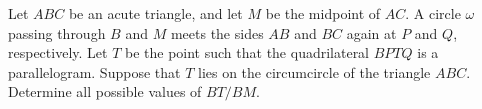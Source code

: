 Let $ABC$ be an acute triangle, and let $M$ be the midpoint of $AC$. A circle $\omega$ passing through $B$ and $M$ meets the sides $AB$ and $BC$ again at $P$ and $Q$, respectively. Let $T$ be the point such that the quadrilateral $BPTQ$ is a parallelogram. Suppose that $T$ lies on the circumcircle of the triangle $ABC$. Determine all possible values of $BT/BM$.
